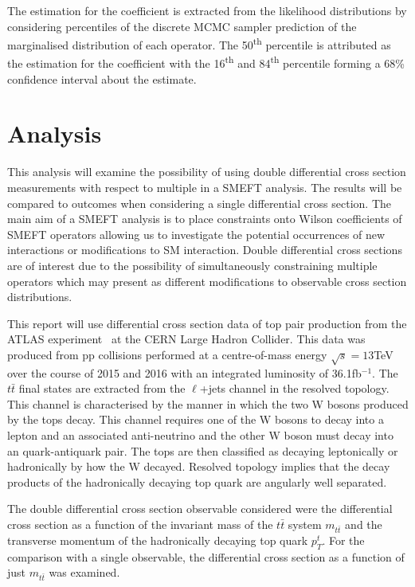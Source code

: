 \documentclass[a4paper,11pt]{article}
\newcommand{\ts}{\textsuperscript}
\begin{document}
The estimation for the coefficient is extracted from the likelihood distributions by considering percentiles of the discrete MCMC sampler prediction of the marginalised distribution of each operator.
The 50\ts{th} percentile is attributed as the estimation for the coefficient with the 16\ts{th} and 84\ts{th} percentile forming a 68\% confidence interval about the estimate.


\section{Analysis}
This analysis will examine the possibility of using double differential cross section measurements with respect to multiple in a SMEFT analysis.
The results will be compared to outcomes when considering a single differential cross section.
The main aim of a SMEFT analysis is to place constraints onto Wilson coefficients of SMEFT operators allowing us to investigate the potential occurrences of new interactions or modifications to SM interaction.
Double differential cross sections are of interest due to the possibility of simultaneously constraining multiple operators which may present as different modifications to observable cross section distributions.

This report will use differential cross section data of top pair production from the ATLAS experiment~\cite{ATLAS:2019hxz} at the CERN Large Hadron Collider.
This data was produced from pp collisions performed at a centre-of-mass energy $\sqrt{s} = 13$TeV over the course of 2015 and 2016 with an integrated luminosity of 36.1fb$^{-1}$.
The $t\bar{t}$ final states are extracted from the $\ell$+jets channel in the resolved topology.
This channel is characterised by the manner in which the two W bosons produced by the tops decay.
This channel requires one of the W bosons to decay into a lepton and an associated anti-neutrino and the other W boson must decay into an quark-antiquark pair.
The tops are then classified as decaying leptonically or hadronically by how the W decayed.
Resolved topology implies that the decay products of the hadronically decaying top quark are angularly well separated.

The double differential cross section observable considered  were the differential cross section as a function of the invariant mass of the $t\bar{t}$ system $m_{t\bar{t}}$ and the transverse momentum of the hadronically decaying top quark $p_{T}^{t}$.
For the comparison with a single observable, the differential cross section as a function of just $m_{t\bar{t}}$ was examined.
\end{document}
